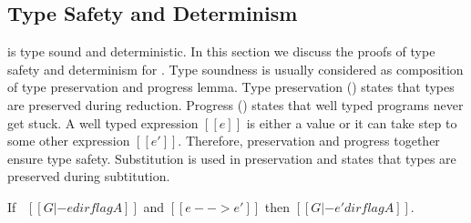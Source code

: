 \subsection{Type Safety and Determinism}
\label{sec:union:safety}
\cal is type sound and deterministic. In this section we discuss the
proofs of type safety and determinism for \cal. Type soundness is usually
considered as composition of type preservation and progress
lemma. Type preservation () states that
types are preserved during reduction. Progress
() states that well typed programs never get
stuck.  A well typed expression $[[e]]$ is either a value or it can
take step to some other expression $[[e']]$. Therefore, preservation and progress
together ensure type safety.
Substitution  is used in preservation and 
states that types are preserved during subtitution.

\begin{lemma}
\label{lemma:union:preservation}
  If \ $[[G |- e dirflag A]]$ and $[[e --> e']]$ then $[[G |- e' dirflag A]]$.
\end{lemma}

\begin{comment}
\begin{proof}
  By induction on typing relation and subsequent inverting reduction relation.
  \begin{itemize}
    \item Cases \rref{typ-int, typ-var, typ-sub, typ-abs} are trivial to prove.
    \item Case \rref{typ-ann} requires helping \cref{lemma:union:check-pexpr-ann}.
    \item Case \rref{typ-app} requires helping \cref{lemma:union:pexpr-check-sub}
          and substitution \cref{lemma:union:substitution} for beta reduction.
    \item Case \rref{typ-typeof} requires substitution \cref{lemma:union:substitution}.
  \end{itemize}
\end{proof}

\baber{ToDo: change name of helping lemmas.}

\begin{lemma}[check-pexpr-ann]
\label{lemma:union:check-pexpr-ann}
  If \ $[[G |- p:C <= A]]$ \ then \ $[[G |- p <= A]]$.
\end{lemma}

\begin{lemma}[pexpr-check-sub]
\label{lemma:union:pexpr-check-sub}
  If \ $[[G |- p <= A]]$ \ and \ $[[A <: B]]$ \ then \ $[[G |- p <= B]]$.
\end{lemma}
\end{comment}

